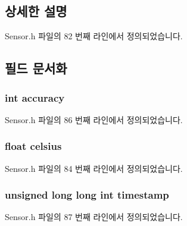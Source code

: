 \subsection{상세한 설명}


Sensor.\-h 파일의 82 번째 라인에서 정의되었습니다.



\subsection{필드 문서화}
\hypertarget{struct___temperature__data_a5565cf9073275f9713f9016e7c10d25f}{
\subsubsection[{accuracy}]{\setlength{\rightskip}{0pt plus 5cm}int accuracy}}\label{struct___temperature__data_a5565cf9073275f9713f9016e7c10d25f}


Sensor.\-h 파일의 86 번째 라인에서 정의되었습니다.

\hypertarget{struct___temperature__data_aadc6619595463c1d61980fc95cad3f53}{
\subsubsection[{celsius}]{\setlength{\rightskip}{0pt plus 5cm}float celsius}}\label{struct___temperature__data_aadc6619595463c1d61980fc95cad3f53}


Sensor.\-h 파일의 84 번째 라인에서 정의되었습니다.

\hypertarget{struct___temperature__data_a8de02c4128636a7bf630ff5428f60c8d}{
\subsubsection[{timestamp}]{\setlength{\rightskip}{0pt plus 5cm}unsigned long long int timestamp}}\label{struct___temperature__data_a8de02c4128636a7bf630ff5428f60c8d}


Sensor.\-h 파일의 87 번째 라인에서 정의되었습니다.


